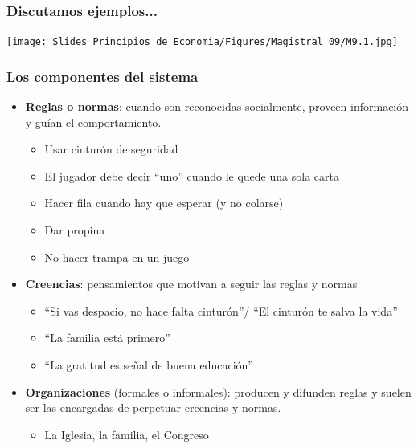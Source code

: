 \documentclass{beamer}
\begin{document}
\begin{frame}
\frametitle{Discutamos ejemplos...}
\centering
\texttt{[image: Slides Principios de Economia/Figures/Magistral\_09/M9.1.jpg]}
\end{frame}

\begin{frame}
\frametitle{Los componentes del sistema}
\begin{itemize}
    \item \textbf{Reglas o normas}: cuando son reconocidas socialmente, proveen información y guían el comportamiento.
        \begin{itemize}
        \item Usar cinturón de seguridad
        \item El jugador debe decir “uno” cuando le quede una sola carta 
        \item Hacer fila cuando hay que esperar (y no colarse) 
        \item Dar propina
        \item No hacer trampa en un juego
        \end{itemize}
    \item \textbf{Creencias}: pensamientos que motivan a seguir las reglas y normas
        \begin{itemize}
        \item “Si vas despacio, no hace falta cinturón”/ “El cinturón te salva la vida”
        \item “La familia está primero”
        \item  “La gratitud es señal de buena educación” \vspace{1mm}
        \end{itemize}
    \item \textbf{Organizaciones} (formales o informales): producen y difunden reglas y suelen ser las encargadas de perpetuar creencias y normas. 
        \begin{itemize}
        \item La Iglesia, la familia, el Congreso
        \end{itemize}
\end{itemize}
\end{frame}
\end{document}
